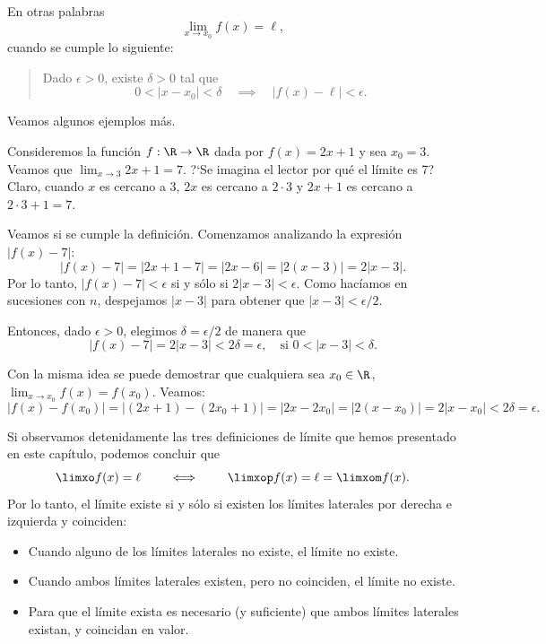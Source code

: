 \begin{remark}
    En otras palabras
    \[
    \lim_{x\to x_0}f(x)=\ell,
    \]
    cuando se cumple lo siguiente:
    \begin{quote}
        Dado $\epsilon > 0$, existe $\delta > 0$ tal que 
        \[
        0<|x-x_0|<\delta
        \quad\implies\quad |f(x)-\ell| < \epsilon.
        \]
    \end{quote}
\end{remark}

Veamos algunos ejemplos más.

\begin{example}
    Consideremos la función $f:\R\to\R$ dada por $f(x)=2x+1$ y sea $x_0=3$. Veamos que $\lim_{x\to 3}2x+1=7$.
    ?`Se imagina el lector por qué el límite es 7? Claro, cuando $x$ es cercano a $3$, $2x$ es cercano a $2\cdot3$ y $2x+1$ es cercano a $2\cdot 3+1=7$.

    Veamos si se cumple la definición. Comenzamos analizando la expresión $|f(x)-7|$:
    \[
    |f(x)-7| = |2x+1-7|=|2x-6|=|2(x-3)|=2|x-3|.
    \]
    Por lo tanto, $|f(x)-7| < \epsilon$ si y sólo si $2|x-3|<\epsilon$. Como hacíamos en sucesiones con $n$, despejamos $|x-3|$ para obtener que $|x-3|<\epsilon/2$.

    Entonces, dado $\epsilon>0$, elegimos $\delta = \epsilon/2$ de manera que
    \[
    |f(x)-7| = 2|x-3| < 2\delta = \epsilon,
    \quad\text{si $0<|x-3|<\delta$}.
    \]

    Con la misma idea se puede demostrar que cualquiera sea $x_0\in\R$, $\lim_{x\to x_0}f(x)=f(x_0)$. 
    Veamos:
    \[
    |f(x)-f(x_0)| = |(2x+1)-(2x_0+1)|=|2x-2x_0|=|2(x-x_0)|=2|x-x_0| < 2\delta=\epsilon.
    \]
\end{example}

\begin{remark}\label{R:limites-laterales-iguales}
    Si observamos detenidamente las tres definiciones de límite que hemos presentado en este capítulo, podemos concluir que
    \[
    \limxo f(x)=\ell \qquad \iff \qquad \limxop f(x) = \ell = \limxom f(x).
    \]
    Por lo tanto, el límite existe si y sólo si existen los límites laterales por derecha e izquierda y coinciden:
\begin{itemize}
    \item Cuando alguno de los límites laterales no existe, el límite no existe.

    \item Cuando ambos límites laterales existen, pero no coinciden, el límite no existe.

    \item Para que el límite exista es necesario (y suficiente) que ambos límites laterales existan, y coincidan en valor.

\end{itemize}
\end{remark}

